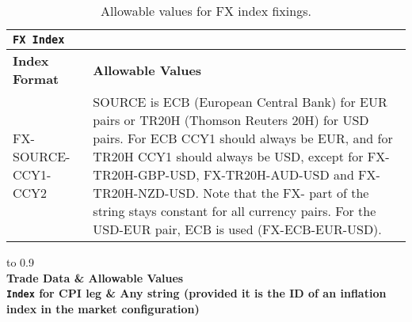 \begin{table}[H]
\centering
\begin{tabular}{|l|p{10cm}|}
\hline
\multicolumn{2}{|l|}{\tt FX Index}   \\ \hline
\textbf{Index Format} &\textbf{Allowable Values}     \\ \hline
FX-SOURCE-CCY1-CCY2    &    
SOURCE is ECB (European Central Bank) for EUR pairs or TR20H (Thomson
Reuters 20H) for USD pairs. For ECB CCY1 should always be EUR, and for
TR20H CCY1 should always be USD, except for FX-TR20H-GBP-USD,
FX-TR20H-AUD-USD and FX-TR20H-NZD-USD. Note that the FX- part of the
string stays constant for all currency pairs. For the USD-EUR pair, ECB is used
(FX-ECB-EUR-USD).\\ \hline
\end{tabular}
  \caption{Allowable values for FX index fixings.}
  \label{tab:fxindex_data}
\end{table}

\begin{table}[H]
\centering
  \begin{tabu} to 0.9\linewidth {| X[-1.5,l,m] | X[-5,l,m] |}
    \hline
     \\ \hline
    \bfseries{Trade Data} & \bfseries{Allowable Values} \\
    \hline
    \lstinline!Index! for CPI leg & Any string (provided it is the ID of an inflation index in the market configuration) \\
    \hline
  \end{tabu}
  \caption{Allowable values for CPI index.}
  \label{tab:cpiindex_data}
\end{table}

